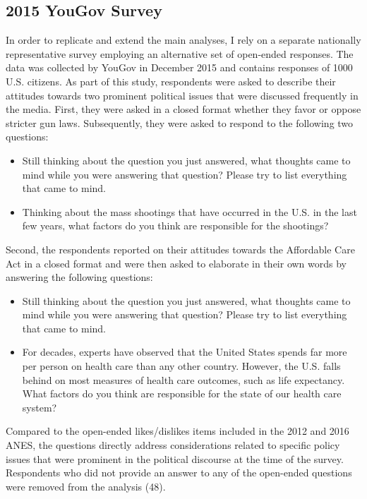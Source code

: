 \subsection*{2015 YouGov Survey}
In order to replicate and extend the main analyses, I rely on a separate nationally representative survey employing an alternative set of open-ended responses. The data was collected by YouGov in December 2015 and contains responses of 1000 U.S. citizens. %
As part of this study, respondents were asked to describe their attitudes towards two prominent political issues that were discussed frequently in the media. First, they were asked in a closed format whether they favor or oppose stricter gun laws. Subsequently, they were asked to respond to the following two questions:
\begin{itemize}\setlength\itemsep{0em}
\item Still thinking about the question you just answered, what thoughts came to mind while you were answering that question? Please try to list everything that came to mind.
\item Thinking about the mass shootings that have occurred in the U.S. in the last few years, what factors do you think are responsible for the shootings?
\end{itemize}
Second, the respondents reported on their attitudes towards the Affordable Care Act in a closed format and were then asked to elaborate in their own words by answering the following questions:
\begin{itemize}\setlength\itemsep{0em}
\item Still thinking about the question you just answered, what thoughts came to mind while you were answering that question? Please try to list everything that came to mind.
\item For decades, experts have observed that the United States spends far more per person on health care than any other country. However, the U.S. falls behind on most measures of health care outcomes, such as life expectancy. What factors do you think are responsible for the state of our health care system?
\end{itemize}
Compared to the open-ended likes/dislikes items included in the 2012 and 2016 ANES, the questions directly address considerations related to specific policy issues that were prominent in the political discourse at the time of the survey. Respondents who did not provide an answer to any of the open-ended questions were removed from the analysis (48).


